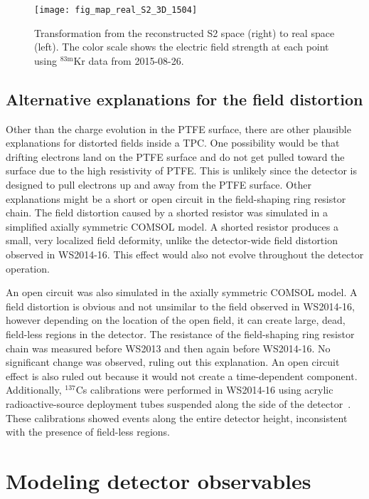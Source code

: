 \documentclass[11pt,a4paper]{article}
\newcommand{\isot}[2]{$^{\textrm{#2}}$#1 }
\newcommand{\krm}{\isot{Kr}{83m}}
\begin{document}
\begin{figure}[!ht]
\begin{center}
\texttt{[image: fig\_map\_real\_S2\_3D\_1504]}
\caption{Transformation from the reconstructed S2 space (right) to real space (left). The color scale shows the electric field strength at each point using \krm data from 2015-08-26.}
\label{fig:real_S2}
\end{center} 
\end{figure}


\subsection{Alternative explanations for the field distortion}
Other than the charge evolution in the PTFE surface, there are other plausible explanations for distorted fields inside a TPC. One possibility would be that drifting electrons land on the PTFE surface and do not get pulled toward the surface due to the high resistivity of PTFE. This is unlikely since the detector is designed to pull electrons up and away from the PTFE surface. Other explanations might be a short or open circuit in the field-shaping ring resistor chain. The field distortion caused by a shorted resistor was simulated in a simplified axially symmetric \textsc{COMSOL} model. A shorted resistor produces a small, very localized field deformity, unlike the detector-wide field distortion observed in WS2014-16. This effect would also not evolve throughout the detector operation. 

An open circuit was also simulated in the axially symmetric \textsc{COMSOL} model. A field distortion is obvious and not unsimilar to the field observed in WS2014-16, however depending on the location of the open field, it can create large, dead, field-less regions in the detector. The resistance of the field-shaping ring resistor chain was measured before WS2013 and then again before WS2014-16. No significant change was observed, ruling out this explanation. An open circuit effect is also ruled out because it would not create a time-dependent component. Additionally, \isot{Cs}{137} calibrations were performed in WS2014-16 using acrylic radioactive-source deployment tubes suspended along the side of the detector~\cite{Akerib:2012ys}. These calibrations showed events along the entire detector height, inconsistent with the presence of field-less regions.


\section{Modeling detector observables}
\end{document}
